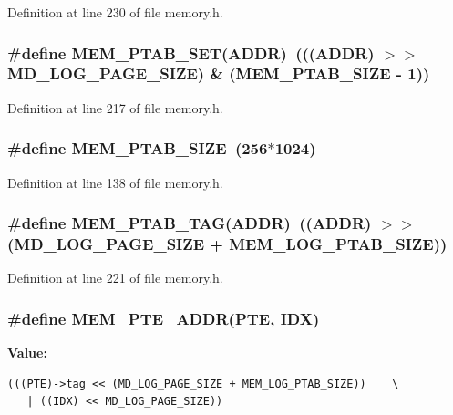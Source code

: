 Definition at line 230 of file memory.h.
\subsubsection[{MEM\_\-PTAB\_\-SET}]{\setlength{\rightskip}{0pt plus 5cm}\#define MEM\_\-PTAB\_\-SET(ADDR)~(((ADDR) $>$$>$ MD\_\-LOG\_\-PAGE\_\-SIZE) \& (MEM\_\-PTAB\_\-SIZE - 1))}\label{memory_8h_4ab2e3db8a6c800c8b61d638bab14a97}




Definition at line 217 of file memory.h.
\subsubsection[{MEM\_\-PTAB\_\-SIZE}]{\setlength{\rightskip}{0pt plus 5cm}\#define MEM\_\-PTAB\_\-SIZE~(256$\ast$1024)}\label{memory_8h_5b1198a1e1df589729b1f3533005ae3e}




Definition at line 138 of file memory.h.
\subsubsection[{MEM\_\-PTAB\_\-TAG}]{\setlength{\rightskip}{0pt plus 5cm}\#define MEM\_\-PTAB\_\-TAG(ADDR)~((ADDR) $>$$>$ (MD\_\-LOG\_\-PAGE\_\-SIZE + MEM\_\-LOG\_\-PTAB\_\-SIZE))}\label{memory_8h_22dca2aefeec3059d2f9799d085a024c}




Definition at line 221 of file memory.h.
\subsubsection[{MEM\_\-PTE\_\-ADDR}]{\setlength{\rightskip}{0pt plus 5cm}\#define MEM\_\-PTE\_\-ADDR(PTE, \/  IDX)}\label{memory_8h_5181baa328a8761b4e4664e290eb2911}


\textbf{Value:}

\begin{Code}\begin{verbatim}(((PTE)->tag << (MD_LOG_PAGE_SIZE + MEM_LOG_PTAB_SIZE))    \
   | ((IDX) << MD_LOG_PAGE_SIZE))
\end{verbatim}
\end{Code}


